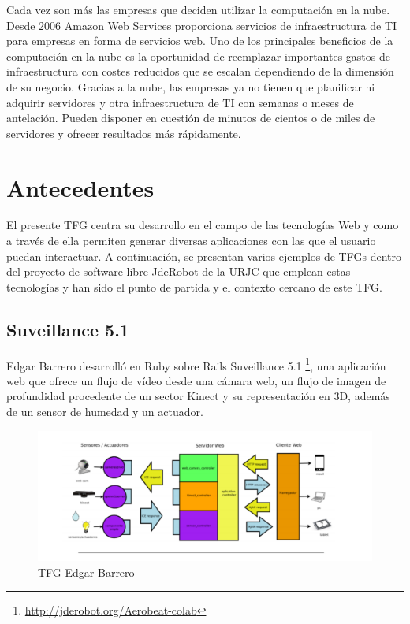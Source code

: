 Cada vez son más las empresas que deciden utilizar la computación en la nube. Desde 2006 Amazon Web Services proporciona servicios de infraestructura de TI para empresas en forma de servicios web.
Uno de los principales beneficios de la computación en la nube es la oportunidad de reemplazar importantes gastos de infraestructura con costes reducidos que se escalan dependiendo de la dimensión de su negocio.
Gracias a la nube, las empresas ya no tienen que planificar ni adquirir servidores y otra infraestructura de TI con semanas o meses de antelación. Pueden disponer en cuestión de minutos de cientos o de miles de servidores y ofrecer resultados más rápidamente.

\section{Antecedentes}
El presente TFG centra su desarrollo en el campo de las tecnologías Web y como a través de ella permiten generar diversas aplicaciones con las que el usuario puedan interactuar. A continuación, se presentan varios ejemplos de TFGs dentro del proyecto de software libre JdeRobot de la URJC que emplean estas tecnologías y han sido el punto de partida y el contexto cercano de este TFG.

\subsection*{Suveillance 5.1}
Edgar Barrero desarrolló en Ruby sobre Rails Suveillance 5.1 \footnote{\url{http://jderobot.org/Aerobeat-colab}}\cite{TFGsurveillance5.1}\cite{surveillance5.1}, una aplicación web que ofrece un flujo de vídeo desde una cámara web, un flujo de imagen de profundidad procedente de un sector Kinect y su representación en 3D, además de un sensor de humedad y un actuador.


\begin{figure}[!h]
    \centering
    \includegraphics[width=190mm]{img/introduccion/edgar.png}
    \caption{TFG Edgar Barrero}
\end{figure}

